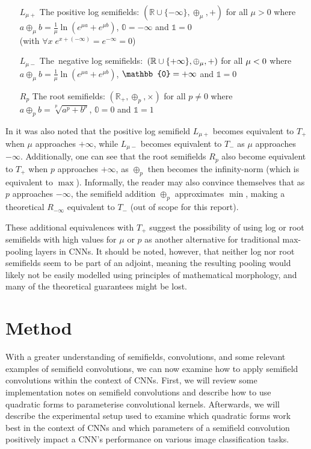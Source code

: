 \documentclass[a4paper, 12pt]{report}
\def\gray#1{\color{gray}#1\color{black}}
\begin{document}
\begin{itemize}
	\item[$L_{\mu+}$]  The positive log semifields:  $(\mathbb{R}\cup \{-\infty\}, \oplus_\mu, +)$ for all $\mu>0$ where \\$a\oplus_\mu b= \frac{1}{\mu}\ln(e^{\mu a}+e^{\mu b})$, $\mathbb{0}=-\infty$ and $\mathbb{1}=0$ 
	\\(with $\forall x\;e^{x+(-\infty)}=e^{-\infty}=0$)
	\item[$L_{\mu-}$]  \gray{The}\ negative \gray{log semifields:\  $(\mathbb{R}\cup \{{\color{black}+\infty}\}, \oplus_\mu, +)$ for all ${\color{black}\mu<0}$ where \\$a\oplus_\mu b= \frac{1}{\mu}\ln(e^{\mu a}+e^{\mu b})$, $\mathbb{0}={\color{black}+\infty}$ and $\mathbb{1}=0$}
	\item[$R_p$]  The root semifields:  $(\mathbb{R}_+, \oplus_p, \times)$ for all $p\ne0$ where \\$a\oplus_p b= \sqrt[p]{a^p+b^p}$, $\mathbb{0}=0$ and $\mathbb{1}=1$
\end{itemize}

\noindent
In \cite{bellaardaxiomatic} it was also noted that the positive log semifield $L_{\mu+}$ becomes equivalent to $T_+$ when $\mu$ approaches $+\infty$, while $L_{\mu-}$ becomes equivalent to $T_-$ as $\mu$ approaches $-\infty$. 
Additionally, one can see that the root semifields $R_p$ also become equivalent to $T_+$ when $p$ approaches $+\infty$, as $\oplus_p$ then becomes the infinity-norm (which is equivalent to $\max$). Informally, the reader may also convince themselves that as $p$ approaches $-\infty$, the semifield addition $\oplus_p$ approximates $\min$, making a theoretical $R_{-\infty}$ equivalent to $T_-$ (out of scope for this report).

These additional equivalences with $T_+$ suggest the possibility of using log or root semifields with high values for $\mu$ or $p$ as another alternative for traditional max-pooling layers in CNNs. It should be noted, however, that neither log nor root semifields seem to be part of an adjoint, meaning the resulting pooling would likely not be easily modelled using principles of mathematical morphology, and many of the theoretical guarantees might be lost.


\chapter{Method}
With a greater understanding of semifields, convolutions, and some relevant examples of semifield convolutions, we can now examine how to apply semifield convolutions within the context of CNNs. 
First, we will review some implementation notes on semifield convolutions and describe how to use quadratic forms to parameterise convolutional kernels. Afterwards, we will describe the experimental setup used to examine which quadratic forms work best in the context of CNNs and which parameters of a semifield convolution positively impact a CNN's performance on various image classification tasks.
\end{document}
